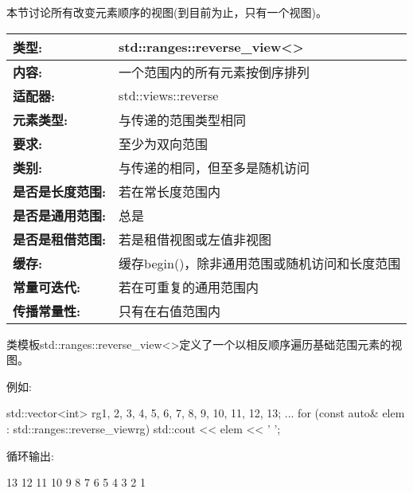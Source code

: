 
本节讨论所有改变元素顺序的视图(到目前为止，只有一个视图)。


\begin{longtable}[c]{|l|l|}
\hline
\textbf{类型:}              & std::ranges::reverse\_view\textless{}\textgreater{}                 \\ \hline
\endfirsthead
%
\endhead
%
\textbf{内容:}              & 一个范围内的所有元素按倒序排列 \\ \hline
\textbf{适配器:}              & std::views::reverse                      \\ \hline
\textbf{元素类型:}         & 与传递的范围类型相同                \\ \hline
\textbf{要求:}             & 至少为双向范围             \\ \hline
\textbf{类别:}             & 与传递的相同，但至多是随机访问 \\ \hline
\textbf{是否是长度范围:}       & 若在常长度范围内                        \\ \hline
\textbf{是否是通用范围:}      & 总是                                   \\ \hline
\textbf{是否是租借范围:} & 若是租借视图或左值非视图                           \\ \hline
\textbf{缓存:}            & 缓存begin()，除非通用范围或随机访问和长度范围 \\ \hline
\textbf{常量可迭代:}       & 若在可重复的通用范围内        \\ \hline
\textbf{传播常量性:} & 只有在右值范围内                  \\ \hline
\end{longtable}

类模板std::ranges::reverse\_view<>定义了一个以相反顺序遍历基础范围元素的视图。

例如:

\begin{cpp}
std::vector<int> rg{1, 2, 3, 4, 5, 6, 7, 8, 9, 10, 11, 12, 13};
...
for (const auto& elem : std::ranges::reverse_view{rg}) {
	std::cout << elem << ' ';
}
\end{cpp}

循环输出:

\begin{shell}
13 12 11 10 9 8 7 6 5 4 3 2 1
\end{shell}

